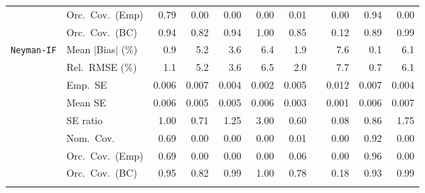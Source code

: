 \begin{landscape}
\begin{longtable}{llrrrrrrrrr}
 & Orc.\ Cov.\ (Emp) & \cellcolor{ranktwo}0.79 & 0.00 & 0.00 & 0.00 & \cellcolor{rankthree}0.01 &  & 0.00 & \cellcolor{rankone}0.94 & 0.00 \\
 & Orc.\ Cov.\ (BC) & \cellcolor{rankone}0.94 & 0.82 & \cellcolor{rankone}0.94 & \cellcolor{rankthree}1.00 & 0.85 &  & 0.12 & 0.89 & \cellcolor{ranktwo}0.99 \\
\addlinespace[2pt]
\quad \texttt{Neyman-IF} & Mean $|$Bias$|$ (\%) & \cellcolor{ranktwo}0.9 & 5.2 & 3.6 & 6.4 & \cellcolor{rankthree}1.9 &  & 7.6 & \cellcolor{rankone}0.1 & 6.1 \\
 & Rel.\ RMSE (\%) & \cellcolor{ranktwo}1.1 & 5.2 & 3.6 & 6.5 & \cellcolor{rankthree}2.0 &  & 7.7 & \cellcolor{rankone}0.7 & 6.1 \\
 & Emp.\ SE & 0.006 & 0.007 & 0.004 & 0.002 & 0.005 &  & 0.012 & 0.007 & 0.004 \\
 & Mean SE & 0.006 & 0.005 & 0.005 & 0.006 & 0.003 &  & 0.001 & 0.006 & 0.007 \\
 & SE ratio & \cellcolor{rankone}1.00 & 0.71 & \cellcolor{rankthree}1.25 & 3.00 & 0.60 &  & 0.08 & \cellcolor{ranktwo}0.86 & 1.75 \\
 & Nom.\ Cov. & \cellcolor{ranktwo}0.69 & 0.00 & 0.00 & 0.00 & \cellcolor{rankthree}0.01 &  & 0.00 & \cellcolor{rankone}0.92 & 0.00 \\
 & Orc.\ Cov.\ (Emp) & \cellcolor{ranktwo}0.69 & 0.00 & 0.00 & 0.00 & \cellcolor{rankthree}0.06 &  & 0.00 & \cellcolor{rankone}0.96 & 0.00 \\
 & Orc.\ Cov.\ (BC) & \cellcolor{rankone}0.95 & 0.82 & \cellcolor{rankthree}0.99 & 1.00 & 0.78 &  & 0.18 & \cellcolor{ranktwo}0.93 & \cellcolor{rankthree}0.99 \\
\addlinespace[2pt]
\end{longtable}
\end{landscape}
